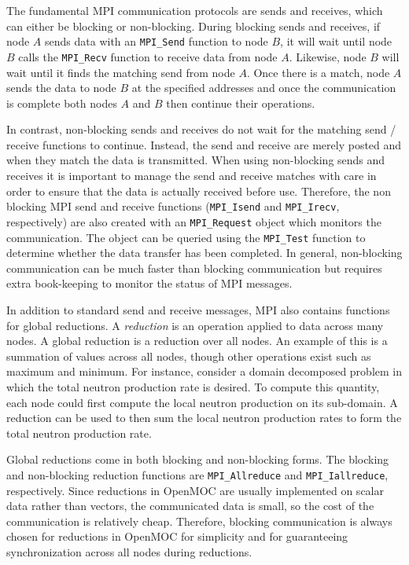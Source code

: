 The fundamental \ac{MPI} communication protocols are sends and receives, which can either be blocking or non-blocking. During blocking sends and receives, if node $A$ sends data with an \texttt{MPI_Send} function to node $B$, it will wait until node $B$ calls the \texttt{MPI_Recv} function to receive data from node $A$. Likewise, node $B$ will wait until it finds the matching send from node $A$. Once there is a match, node $A$ sends the data to node $B$ at the specified addresses and once the communication is complete both nodes $A$ and $B$ then continue their operations.

In contrast, non-blocking sends and receives do not wait for the matching send / receive functions to continue. Instead, the send and receive are merely posted and when they match the data is transmitted. When using non-blocking sends and receives it is important to manage the send and receive matches with care in order to ensure that the data is actually received before use. Therefore, the non blocking \ac{MPI} send and receive functions (\texttt{MPI_Isend} and \texttt{MPI_Irecv}, respectively) are also created with an \texttt{MPI_Request} object which monitors the communication. The object can be queried using the \texttt{MPI_Test} function to determine whether the data transfer has been completed. In general, non-blocking communication can be much faster than blocking communication but requires extra book-keeping to monitor the status of \ac{MPI} messages.

In addition to standard send and receive messages, \ac{MPI} also contains functions for global reductions. A \textit{reduction} is an operation applied to data across many nodes. A global reduction is a reduction over all nodes. An example of this is a summation of values across all nodes, though other operations exist such as maximum and minimum. For instance, consider a domain decomposed problem in which the total neutron production rate is desired. To compute this quantity, each node could first compute the local neutron production on its sub-domain. A reduction can be used to then sum the local neutron production rates to form the total neutron production rate.

Global reductions come in both blocking and non-blocking forms. The blocking and non-blocking reduction functions are \texttt{MPI_Allreduce} and \texttt{MPI_Iallreduce}, respectively. Since reductions in OpenMOC are usually implemented on scalar data rather than vectors, the communicated data is small, so the cost of the communication is relatively cheap. Therefore, blocking communication is always chosen for reductions in OpenMOC for simplicity and for guaranteeing synchronization across all nodes during reductions.

